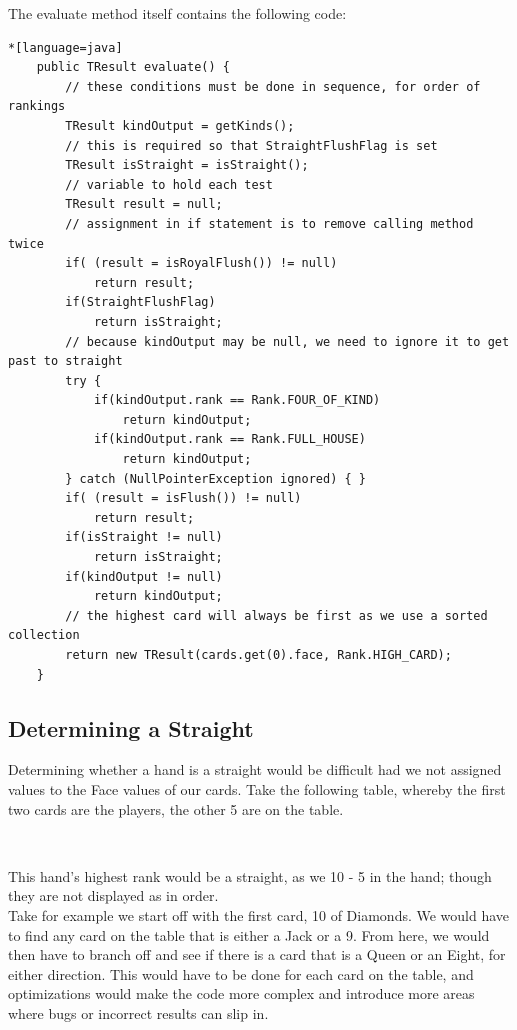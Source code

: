 \documentclass[11pt]{article}
\begin{document}
The evaluate method itself contains the following code: 

\begin{lstlisting}*[language=java]
    public TResult evaluate() {
        // these conditions must be done in sequence, for order of rankings
        TResult kindOutput = getKinds();
        // this is required so that StraightFlushFlag is set
        TResult isStraight = isStraight();
        // variable to hold each test
        TResult result = null;
        // assignment in if statement is to remove calling method twice
        if( (result = isRoyalFlush()) != null)
            return result;
        if(StraightFlushFlag)
            return isStraight;
        // because kindOutput may be null, we need to ignore it to get past to straight
        try {
            if(kindOutput.rank == Rank.FOUR_OF_KIND)
                return kindOutput;
            if(kindOutput.rank == Rank.FULL_HOUSE)
                return kindOutput;
        } catch (NullPointerException ignored) { }
        if( (result = isFlush()) != null)
            return result;
        if(isStraight != null)
            return isStraight;
        if(kindOutput != null)
            return kindOutput;
        // the highest card will always be first as we use a sorted collection
        return new TResult(cards.get(0).face, Rank.HIGH_CARD);
    }
\end{lstlisting}


\newpage
\subsection{Determining a Straight}
Determining whether a hand is a straight would be difficult had we not assigned values to the Face values of our cards. Take the following table, whereby the first two cards are the players, the other 5 are on the table. \\

\begin{center}
\tendiamonds \twoclubs \ \ \ \ \ \ \  \eightclubs \ninehearts \sixdiamonds \fiveclubs \sevenspades
\end{center}

This hand's highest rank would be a straight, as we 10 - 5 in the hand; though they are not displayed as in order. \\

Take for example we start off with the first card, 10 of Diamonds. We would have to find any card on the table that is either a Jack or a 9. From here, we would then have to branch off and see if there is a card that is a Queen or an Eight, for either direction. This would have to be done for each card on the table, and optimizations would make the code more complex and introduce more areas where bugs or incorrect results can slip in.\\
\end{document}
